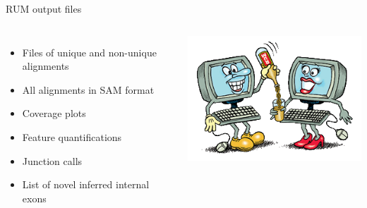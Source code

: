 \documentclass{beamer}
\begin{document}
\begin{frame}{RUM output files}
  \begin{columns}
    \column{2.5in}
\begin{itemize}
  \item Files of unique and non-unique alignments
  \item All alignments in SAM format
  \item Coverage plots
  \item Feature quantifications
  \item Junction calls
  \item List of novel inferred internal exons
\end{itemize}
\column{2.5in}
\includegraphics[scale=0.4]{rumpouring2.png}
  \end{columns}

\end{frame}
\end{document}
